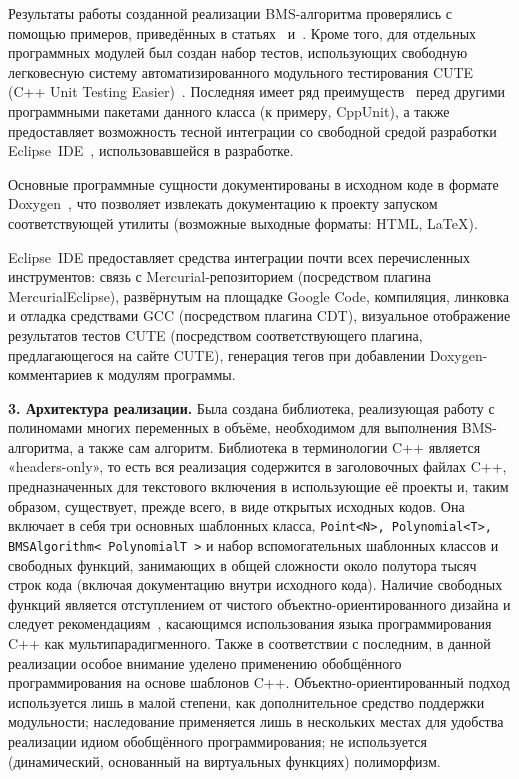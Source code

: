 \documentclass[14pt]{extarticle}
\newcommand{\nspace}{\hspace{0pt}}
\newcommand{\nbdash}{\nobreakdash-\nspace}
\begin{document}
Результаты работы созданной реализации BMS\nbdash{}алгоритма проверялись с
помощью примеров, приведённых в статьях~\cite{Sakata88} и~\cite{Sakata90}. Кроме
того, для отдельных программных модулей был создан набор тестов, использующих
свободную легковесную систему автоматизированного модульного тестирования CUTE
(C++ Unit Testing Easier)~\cite{CUTE}. Последняя имеет ряд
преимуществ~\cite{Sommerlad} перед другими программными пакетами данного класса
(к примеру, CppUnit), а также предоставляет возможность тесной интеграции со
свободной средой разработки Eclipse~IDE~\cite{Eclipse}, использовавшейся в
разработке.

Основные программные сущности документированы в исходном коде в формате
Doxygen~\cite{Doxygen}, что позволяет извлекать документацию к проекту запуском
соответствующей утилиты (возможные выходные форматы: HTML, \LaTeX). 

Eclipse~IDE предоставляет средства интеграции почти всех перечисленных
инструментов: связь с Mercurial\nbdash{}репозиторием (посредством плагина
MercurialEclipse), развёрнутым на площадке Google Code, компиляция, линковка и
отладка средствами GCC (посредством плагина CDT), визуальное отображение
результатов тестов CUTE (посредством соответствующего плагина, предлагающегося
на сайте CUTE), генерация тегов при добавлении Doxygen-комментариев к модулям
программы.

\textbf{3. Архитектура реализации.} Была создана библиотека,
реализующая работу с полиномами многих переменных в объёме, необходимом для
выполнения BMS\nbdash{}алгоритма, а также сам алгоритм. Библиотека в
терминологии C++ является «headers-only», то есть вся реализация содержится в
заголовочных файлах C++, предназначенных для текстового включения в использующие 
её проекты и, таким образом, существует, прежде всего, в виде открытых исходных
кодов. Она включает в себя три основных шаблонных класса, 
\lstinline$Point<N>, Polynomial<T>, BMSAlgorithm< PolynomialT >$
и набор
вспомогательных шаблонных классов и свободных функций, занимающих в общей сложности 
около полутора тысяч строк кода (включая документацию внутри исходного кода). 
Наличие свободных функций является отступлением от чистого
объектно-ориентированного дизайна и следует рекомендациям~\cite[п. 44]{SA05},
касающимся использования языка программирования C++ как мультипарадигменного.
Также в соответствии с последним, в данной реализации особое внимание уделено
применению обобщённого программирования на основе шаблонов C++.
Объектно-ориентированный подход используется лишь в малой степени, как
дополнительное средство поддержки модульности; наследование применяется лишь 
в нескольких местах для удобства реализации идиом обобщённого 
программирования; не используется (динамический, основанный на виртуальных 
функциях) полиморфизм.
\end{document}

